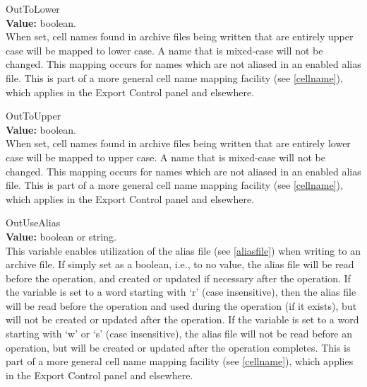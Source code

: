 \begin{description}
\item{\et OutToLower}\\
{\bf Value:} boolean.\\
When set, cell names found in archive files being written that are
entirely upper case will be mapped to lower case.  A name that is
mixed-case will not be changed.  This mapping occurs for names which
are not aliased in an enabled alias file.  This is part of a more
general cell name mapping facility (see \ref{cellname}), which applies
in the {\cb Export Control} panel and elsewhere.

\item{\et OutToUpper}\\
{\bf Value:} boolean.\\
When set, cell names found in archive files being written that are
entirely lower case will be mapped to upper case.  A name that is
mixed-case will not be changed.  This mapping occurs for names which
are not aliased in an enabled alias file.  This is part of a more
general cell name mapping facility (see \ref{cellname}), which applies
in the {\cb Export Control} panel and elsewhere.

\item{\et OutUseAlias}\\
{\bf Value:} boolean or string.\\
This variable enables utilization of the alias file (see
\ref{aliasfile}) when writing to an archive file.  If simply set as a
boolean, i.e., to no value, the alias file will be read before the
operation, and created or updated if necessary after the operation. 
If the variable is set to a word starting with `{\vt r}' (case
insensitive), then the alias file will be read before the operation
and used during the operation (if it exists), but will not be created
or updated after the operation.  If the variable is set to a word
starting with `{\vt w}' or `{\vt s}' (case insensitive), the alias
file will not be read before an operation, but will be created or
updated after the operation completes.  This is part of a more general
cell name mapping facility (see \ref{cellname}), which applies
in the {\cb Export Control} panel and elsewhere.


\end{description}
